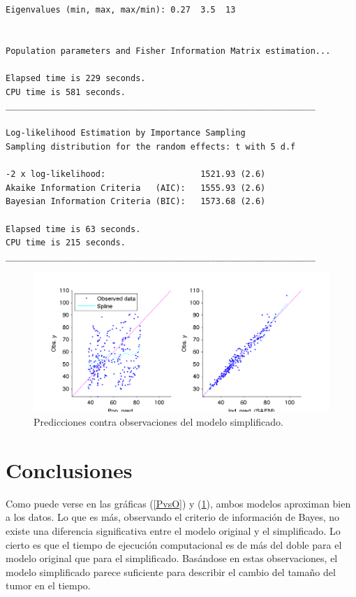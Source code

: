 \documentclass[letterpaper,12pt]{article}
\theoremstyle{definition} \newtheorem{Def}{Definición}[section]
\theoremstyle{definition} \newtheorem{Teo}{Teorema}[section]
\theoremstyle{definition} \newtheorem{Pro}{Proposición}
\theoremstyle{definition} \newtheorem{Lema}{Lema}[section]
\theoremstyle{definition} \newtheorem{Cor}{Corolario}[section]
\begin{document}
\begin{verbatim}
Eigenvalues (min, max, max/min): 0.27  3.5  13


Population parameters and Fisher Information Matrix estimation...

Elapsed time is 229 seconds. 
CPU time is 581 seconds. 
______________________________________________________________

Log-likelihood Estimation by Importance Sampling
Sampling distribution for the random effects: t with 5 d.f

-2 x log-likelihood:                   1521.93 (2.6)
Akaike Information Criteria   (AIC):   1555.93 (2.6)
Bayesian Information Criteria (BIC):   1573.68 (2.6)

Elapsed time is 63 seconds. 
CPU time is 215 seconds. 
______________________________________________________________

\end{verbatim}

\begin{figure}[h]
	\centering
	\includegraphics[angle=0,width=.8\textwidth]{predVsObs2.png}
	\caption{\label{PvsO2}Predicciones contra observaciones del modelo simplificado.}
\end{figure}

\section{Conclusiones}

Como puede verse en las gráficas (\ref{PvsO}) y (\ref{PvsO2}), ambos modelos aproximan bien a los datos. Lo que es más, observando el criterio de información de Bayes, no existe una diferencia significativa entre el modelo original y el simplificado. Lo cierto es que el tiempo de ejecución computacional es de más del doble para el modelo original que para el simplificado. Basándose en estas observaciones, el modelo simplificado parece suficiente para describir el cambio del tamaño del tumor en el tiempo.
\end{document}
